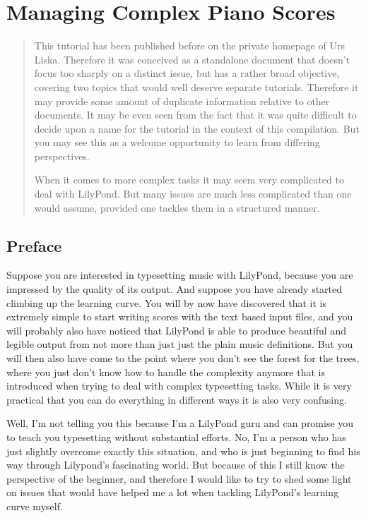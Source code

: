 \documentclass[../LilyPond-Tutorials]{subfiles}
\begin{document}
\chapter{Managing Complex Piano Scores}

\begin{abstract}
This tutorial has been published before on the private homepage of Urs Liska. 
Therefore it was conceived as a standalone document that doesn't focus too sharply on a distinct issue, but has a rather broad objective, covering two topics that would well deserve separate tutorials.
Therefore it may provide some amount of duplicate information relative to other documents. It may be even seen from the fact that it was quite difficult to decide upon a name for the tutorial in the context of this compilation.
But you may see this as a welcome opportunity to learn from differing perspectives.

When it comes to more complex tasks it may seem very complicated to deal with LilyPond.
But many issues are much less complicated than one would assume, provided one tackles them in a structured manner.
\end{abstract}

\section*{Preface}

Suppose you are interested in typesetting music with LilyPond, because you are impressed by the quality of its output. 
And suppose you have already started climbing up the learning curve. 
You will by now have discovered that it is extremely simple to start writing scores with the text based input files, and you will probably also have noticed that LilyPond is able to produce beautiful and legible output from not more than just just the plain music definitions. 
But you will then also have come to the point where you don't see the forest for the trees, where you just don't know how to handle the complexity anymore that is introduced when trying to deal with complex typesetting tasks. 
While it is very practical that you can do everything in different ways it is also very confusing.

Well, I'm not telling you this because I'm a LilyPond guru and can promise you to teach you typesetting without substantial efforts. 
No, I'm a person who has just slightly overcome exactly this situation, and who is just beginning to find his way through Lilypond's fascinating world. 
But because of this I still know the perspective of the beginner, and therefore I would like to try to shed some light on issues that would have helped me a lot when tackling LilyPond's learning curve myself.
\end{document}
